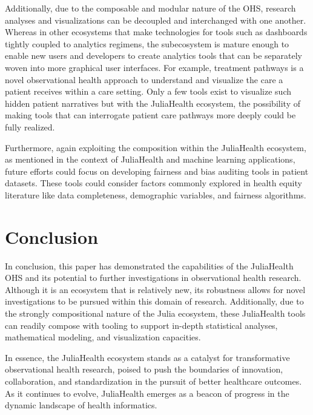 \documentclass{juliacon}
\begin{document}
Additionally, due to the composable and modular nature of the OHS, research analyses and visualizations can be decoupled and interchanged with one another.
Whereas in other ecosystems that make technologies for tools such as dashboards tightly coupled to analytics regimens, the subecosystem is mature enough to enable new users and developers to create analytics tools that can be separately woven into more graphical user interfaces.
For example, treatment pathways is a novel observational health approach to understand and visualize the care a patient receives within a care setting.
Only a few tools exist to visualize such hidden patient narratives but with the JuliaHealth ecosystem, the possibility of making tools that can interrogate patient care pathways more deeply could be fully realized.

Furthermore, again exploiting the composition within the JuliaHealth ecosystem, as mentioned in the context of JuliaHealth and machine learning applications, future efforts could focus on developing fairness and bias auditing tools in patient datasets.
These tools could consider factors commonly explored in health equity literature like data completeness, demographic variables, and fairness algorithms. 

\section{Conclusion}

In conclusion, this paper has demonstrated the capabilities of the JuliaHealth OHS and its potential to further investigations in observational health research.
Although it is an ecosystem that is relatively new, its robustness allows for novel investigations to be pursued within this domain of research. 
Additionally, due to the strongly compositional nature of the Julia ecosystem, these JuliaHealth tools can readily compose with tooling to support in-depth statistical analyses, mathematical modeling, and visualization capacities.

In essence, the JuliaHealth ecosystem stands as a catalyst for transformative observational health research, poised to push the boundaries of innovation, collaboration, and standardization in the pursuit of better healthcare outcomes. As it continues to evolve, JuliaHealth emerges as a beacon of progress in the dynamic landscape of health informatics.
\end{document}
